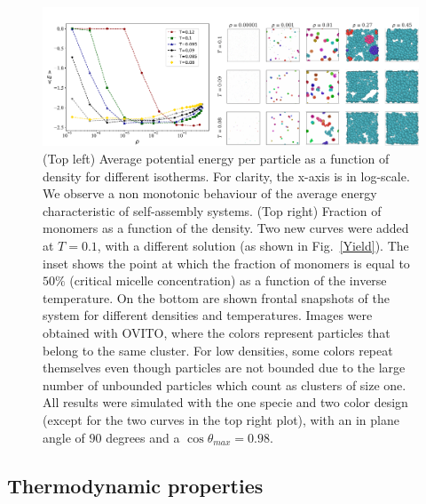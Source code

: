 \documentclass[a4paper, amsfonts, amssymb, amsmath, reprint, showkeys, nofootinbib, twoside]{revtex4-1}
\begin{document}
\begin{figure}[t]
	\includegraphics{fig5.pdf}
	\caption{\label{Energy} (Top left) Average potential energy per particle as a function of density for different isotherms. For clarity, the x-axis is in log-scale. We observe a non monotonic behaviour of the average energy characteristic of self-assembly systems. (Top right) Fraction of monomers as a function of the density. Two new curves were added at $T=0.1$, with a different solution (as shown in Fig.~\ref{Yield}). The inset shows the point at which the fraction of monomers is equal to $50\%$ (critical micelle concentration) as a function of the inverse temperature. On the bottom are shown frontal snapshots of the system for different densities and temperatures. Images were obtained with OVITO, where the colors represent particles that belong to the same cluster. For low densities, some colors repeat themselves even though particles are not bounded due to the large number of unbounded particles which count as clusters of size one. All results were simulated with the one specie and two color design (except for the two curves in the top right plot), with an in plane angle of $90$ degrees and a $\cos\theta_{max}=0.98$.}
\end{figure}

\subsection{Thermodynamic properties}
\end{document}
